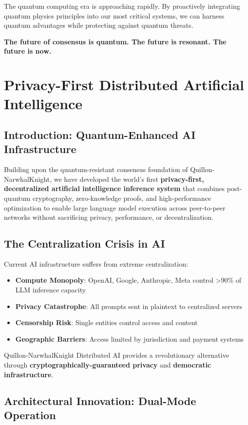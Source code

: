 \documentclass[11pt,a4paper]{article}
\begin{document}
The quantum computing era is approaching rapidly. By proactively integrating quantum physics principles into our most critical systems, we can harness quantum advantages while protecting against quantum threats.

\textbf{The future of consensus is quantum. The future is resonant. The future is now.}

\newpage
\section{Privacy-First Distributed Artificial Intelligence}

\subsection{Introduction: Quantum-Enhanced AI Infrastructure}

Building upon the quantum-resistant consensus foundation of Quillon-NarwhalKnight, we have developed the world's first \textbf{privacy-first, decentralized artificial intelligence inference system} that combines post-quantum cryptography, zero-knowledge proofs, and high-performance optimization to enable large language model execution across peer-to-peer networks without sacrificing privacy, performance, or decentralization.

\subsection{The Centralization Crisis in AI}

Current AI infrastructure suffers from extreme centralization:
\begin{itemize}
    \item \textbf{Compute Monopoly}: OpenAI, Google, Anthropic, Meta control >90\% of LLM inference capacity
    \item \textbf{Privacy Catastrophe}: All prompts sent in plaintext to centralized servers
    \item \textbf{Censorship Risk}: Single entities control access and content
    \item \textbf{Geographic Barriers}: Access limited by jurisdiction and payment systems
\end{itemize}

Quillon-NarwhalKnight Distributed AI provides a revolutionary alternative through \textbf{cryptographically-guaranteed privacy} and \textbf{democratic infrastructure}.

\subsection{Architectural Innovation: Dual-Mode Operation}
\end{document}
